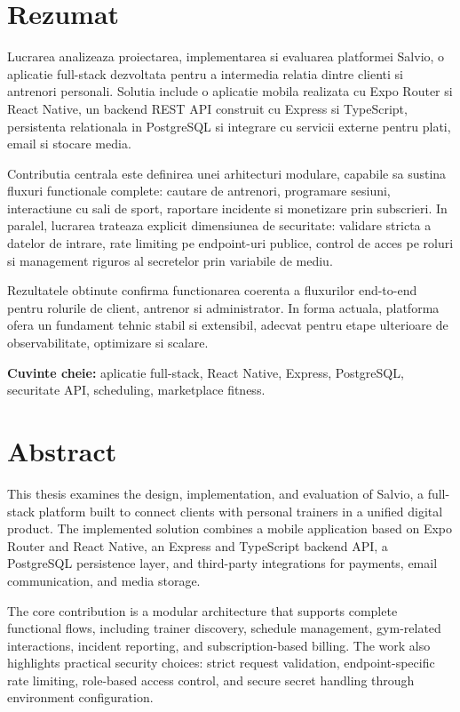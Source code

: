 \chapter*{Rezumat}

Lucrarea analizeaza proiectarea, implementarea si evaluarea platformei Salvio, o aplicatie full-stack dezvoltata pentru a intermedia relatia dintre clienti si antrenori personali. Solutia include o aplicatie mobila realizata cu Expo Router si React Native, un backend REST API construit cu Express si TypeScript, persistenta relationala in PostgreSQL si integrare cu servicii externe pentru plati, email si stocare media.

Contributia centrala este definirea unei arhitecturi modulare, capabile sa sustina fluxuri functionale complete: cautare de antrenori, programare sesiuni, interactiune cu sali de sport, raportare incidente si monetizare prin subscrieri. In paralel, lucrarea trateaza explicit dimensiunea de securitate: validare stricta a datelor de intrare, rate limiting pe endpoint-uri publice, control de acces pe roluri si management riguros al secretelor prin variabile de mediu.

Rezultatele obtinute confirma functionarea coerenta a fluxurilor end-to-end pentru rolurile de client, antrenor si administrator. In forma actuala, platforma ofera un fundament tehnic stabil si extensibil, adecvat pentru etape ulterioare de observabilitate, optimizare si scalare.

\textbf{Cuvinte cheie:} aplicatie full-stack, React Native, Express, PostgreSQL, securitate API, scheduling, marketplace fitness.

\clearpage

\chapter*{Abstract}

This thesis examines the design, implementation, and evaluation of Salvio, a full-stack platform built to connect clients with personal trainers in a unified digital product. The implemented solution combines a mobile application based on Expo Router and React Native, an Express and TypeScript backend API, a PostgreSQL persistence layer, and third-party integrations for payments, email communication, and media storage.

The core contribution is a modular architecture that supports complete functional flows, including trainer discovery, schedule management, gym-related interactions, incident reporting, and subscription-based billing. The work also highlights practical security choices: strict request validation, endpoint-specific rate limiting, role-based access control, and secure secret handling through environment configuration.

